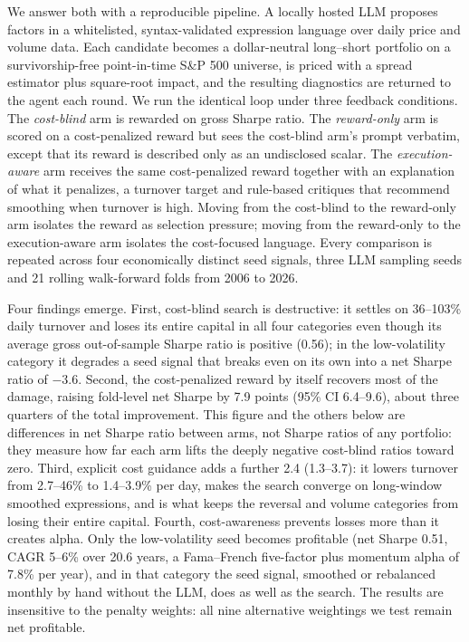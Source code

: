 \documentclass[preprint,12pt,authoryear]{elsarticle}
\begin{document}
We answer both with a reproducible pipeline. A locally hosted LLM proposes factors in a whitelisted, syntax-validated expression language over daily price and volume data. Each candidate becomes a dollar-neutral long--short portfolio on a survivorship-free point-in-time S\&P 500 universe, is priced with a \citet{corwin2012} spread estimator plus square-root impact, and the resulting diagnostics are returned to the agent each round. We run the identical loop under three feedback conditions. The \emph{cost-blind} arm is rewarded on gross Sharpe ratio. The \emph{reward-only} arm is scored on a cost-penalized reward but sees the cost-blind arm's prompt verbatim, except that its reward is described only as an undisclosed scalar. The \emph{execution-aware} arm receives the same cost-penalized reward together with an explanation of what it penalizes, a turnover target and rule-based critiques that recommend smoothing when turnover is high. Moving from the cost-blind to the reward-only arm isolates the reward as selection pressure; moving from the reward-only to the execution-aware arm isolates the cost-focused language. Every comparison is repeated across four economically distinct seed signals, three LLM sampling seeds and 21 rolling walk-forward folds from 2006 to 2026.

Four findings emerge. First, cost-blind search is destructive: it settles on 36--103\% daily turnover and loses its entire capital in all four categories even though its average gross out-of-sample Sharpe ratio is positive (0.56); in the low-volatility category it degrades a seed signal that breaks even on its own into a net Sharpe ratio of $-3.6$. Second, the cost-penalized reward by itself recovers most of the damage, raising fold-level net Sharpe by 7.9 points (95\% CI 6.4--9.6), about three quarters of the total improvement. This figure and the others below are differences in net Sharpe ratio between arms, not Sharpe ratios of any portfolio: they measure how far each arm lifts the deeply negative cost-blind ratios toward zero. Third, explicit cost guidance adds a further 2.4 (1.3--3.7): it lowers turnover from 2.7--46\% to 1.4--3.9\% per day, makes the search converge on long-window smoothed expressions, and is what keeps the reversal and volume categories from losing their entire capital. Fourth, cost-awareness prevents losses more than it creates alpha. Only the low-volatility seed becomes profitable (net Sharpe 0.51, CAGR 5--6\% over 20.6 years, a Fama--French five-factor plus momentum alpha of 7.8\% per year), and in that category the seed signal, smoothed or rebalanced monthly by hand without the LLM, does as well as the search. The results are insensitive to the penalty weights: all nine alternative weightings we test remain net profitable.
\end{document}
